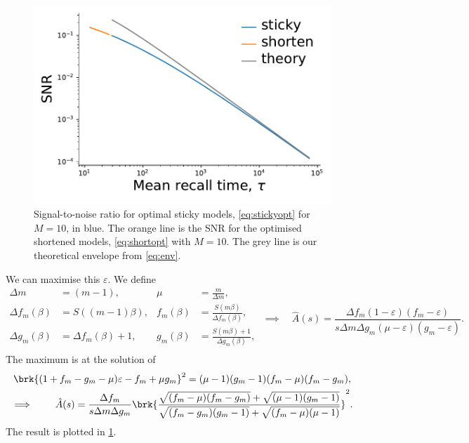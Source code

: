 \documentclass[12pt]{article}
\begin{document}
\begin{figure}[ht]
\begin{center}
  \includegraphics[width=0.4\linewidth]{sticky_opt.pdf}
\caption[Signal-to-noise ratio for optimal sticky models]
{Signal-to-noise ratio for optimal sticky models, \cref{eq:stickyopt} for \(M=10\), in blue.
  The orange line is the SNR for the optimised shortened models, \cref{eq:shortopt} with \(M=10\).
  The grey line is our theoretical envelope from \cref{eq:env}.
  \label{fig:sticky}}
\end{center}
\end{figure}

We can maximise this \wrt \(\varepsilon\).
We define
%
\begin{equation*}
\begin{aligned}
  \Delta m &= (m-1), &
  \mu &= \frac{m}{\Delta m}, \\
  \Delta f_m(\beta) &= S((m-1)\beta), &
  f_m(\beta) &= \frac{S(m\beta)}{\Delta f_m(\beta)}, \\
  \Delta g_m(\beta) &= \Delta f_m(\beta) + 1 , &
  g_m(\beta) &= \frac{S(m\beta) + 1}{\Delta g_m(\beta)}, \\
\end{aligned}
  \; \implies \quad
  \hat{A}(s) = \frac{\Delta f_m (1 - \varepsilon) (f_m - \varepsilon)}
                    {s \Delta m \Delta g_m (\mu - \varepsilon) (g_m - \varepsilon)}.
\end{equation*}
%
The maximum is at the solution of
%
\begin{multline}\label{eq:stickyopt}
  \brk{(1 + f_m -  g_m - \mu)\varepsilon - f_m + \mu g_m}^2 
    = (\mu - 1) (g_m - 1) (f_m - \mu) (f_m - g_m) , \\
  \implies \qquad
  \hat{A}(s) = \frac{\Delta f_m}{s \Delta m \Delta g_m}
      \brk{\frac{\sqrt{(f_m - \mu)(f_m - g_m)} 
                  + \sqrt{(\mu - 1)(g_m - 1)}}
                {\sqrt{(f_m - g_m)(g_m - 1)} 
                  + \sqrt{(f_m - \mu)(\mu - 1)}}}^2.
\end{multline}
%
The result is plotted in \cref{fig:sticky}.
\end{document}
